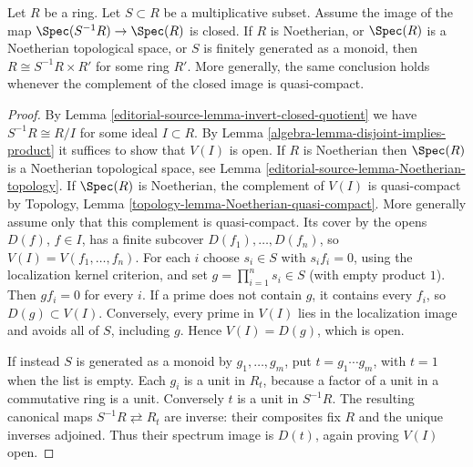 \begin{lemma}
\label{editorial-source-lemma-invert-closed-split}
Let $R$ be a ring. Let $S \subset R$ be a multiplicative subset.
Assume the image of the map $\Spec(S^{-1}R) \to \Spec(R)$
is closed. If $R$ is Noetherian, or $\Spec(R)$ is a
Noetherian topological space, or $S$ is finitely generated as a monoid,
then $R\cong S^{-1}R\times R'$ for some ring $R'$.
More generally, the same conclusion holds whenever the complement
of the closed image is quasi-compact.
\end{lemma}

\begin{proof}
By Lemma \ref{editorial-source-lemma-invert-closed-quotient} we have $S^{-1}R \cong R/I$
for some ideal $I \subset R$. By Lemma \ref{algebra-lemma-disjoint-implies-product}
it suffices to show that $V(I)$ is open.
If $R$ is Noetherian then $\Spec(R)$ is a Noetherian
topological space, see Lemma \ref{editorial-source-lemma-Noetherian-topology}.
If $\Spec(R)$ is Noetherian, the complement of $V(I)$ is
quasi-compact by Topology, Lemma
\ref{topology-lemma-Noetherian-quasi-compact}. More generally assume
only that this complement is quasi-compact. Its cover by the opens
$D(f)$, $f\in I$, has a finite subcover $D(f_1),\ldots,D(f_n)$,
so $V(I)=V(f_1,\ldots,f_n)$. For each $i$ choose $s_i\in S$ with
$s_if_i=0$, using the localization kernel criterion, and set
$g=\prod_{i=1}^n s_i\in S$ (with empty product $1$).
Then $gf_i=0$ for every $i$. If a prime does not contain $g$, it
contains every $f_i$, so $D(g)\subset V(I)$. Conversely, every prime
in $V(I)$ lies in the localization image and avoids all of $S$,
including $g$. Hence $V(I)=D(g)$, which is open.

\medskip\noindent
If instead $S$ is generated as a monoid by $g_1,\ldots,g_m$, put
$t=g_1\cdots g_m$, with $t=1$ when the list is empty.
Each $g_i$ is a unit in $R_t$, because a factor of a unit in a
commutative ring is a unit. Conversely $t$ is a unit in $S^{-1}R$.
The resulting canonical maps $S^{-1}R\rightleftarrows R_t$ are
inverse: their composites fix $R$ and the unique inverses adjoined.
Thus their spectrum image is $D(t)$, again proving $V(I)$ open.


\end{proof}
